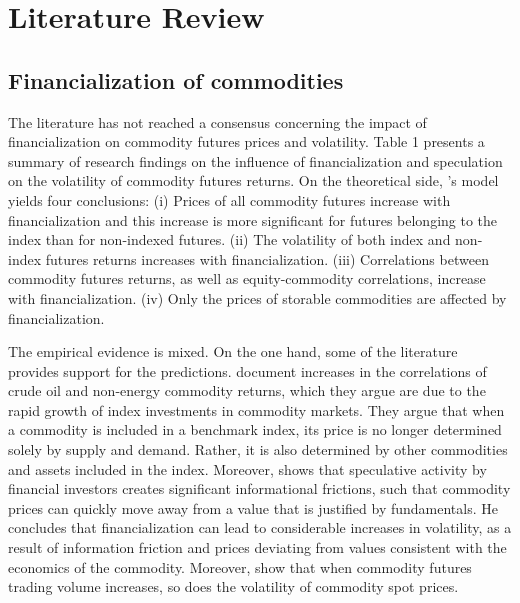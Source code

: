 \documentclass[12pt]{article}
\begin{document}
\section{Literature Review}
\subsection{Financialization of commodities}
The literature has not reached a consensus concerning the impact of financialization on commodity futures prices and volatility. Table 1 presents a summary of research findings on the influence of financialization and speculation on the volatility of commodity futures returns. On the theoretical side, \citet{basak2016model}’s model  yields four conclusions: (i) Prices of all commodity futures increase with financialization and this increase is more significant for futures belonging to the index than for non-indexed futures. (ii) The volatility of both index and non-index futures returns increases with financialization. (iii) Correlations between commodity futures returns, as well as equity-commodity correlations, increase with financialization. (iv) Only the prices of storable commodities are affected by financialization. 

 The empirical evidence is mixed. On  the one hand, some of the literature provides support for the \citet{basak2016model} predictions. \citet{tang2012index} document increases in the correlations of crude oil and non-energy commodity returns, which they argue are due to the rapid growth of index investments in commodity markets. They argue that when a commodity is included in a benchmark index, its price is no longer determined solely by supply and demand. Rather, it is also determined by other commodities and assets included in the index. Moreover, \citet{singleton2014investor} shows that speculative activity by financial investors creates significant informational frictions, such that commodity prices can quickly move away from a value that is justified by fundamentals. He concludes that financialization can lead to considerable increases in volatility, as a result of information friction and prices deviating from values consistent with the economics of the commodity.
Moreover, \citet*{yang2005futures} show that when commodity futures trading volume increases, so does the volatility of commodity spot prices. 
\end{document}
